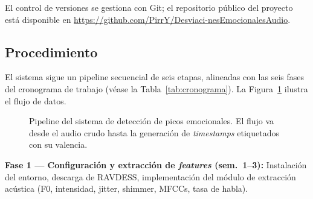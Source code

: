 El control de versiones se gestiona con Git; el repositorio público del proyecto está
disponible en \url{https://github.com/PirrY/Desviaci-nesEmocionalesAudio}.

\subsection{Procedimiento}
\label{sec:met_procedimiento}

El sistema sigue un pipeline secuencial de seis etapas, alineadas con las seis fases
del cronograma de trabajo (véase la Tabla~\ref{tab:cronograma}). La
Figura~\ref{fig:pipeline} ilustra el flujo de datos.

\begin{figure}[!t]
\centering
{}
\caption{Pipeline del sistema de detección de picos emocionales. El flujo va desde el
audio crudo hasta la generación de \textit{timestamps} etiquetados con su valencia.}
\label{fig:pipeline}
\end{figure}

\textbf{Fase 1 — Configuración y extracción de \textit{features} (sem.\ 1--3):}
Instalación del entorno, descarga de RAVDESS, implementación del módulo de extracción
acústica (F0, intensidad, jitter, shimmer, MFCCs, tasa de habla).

